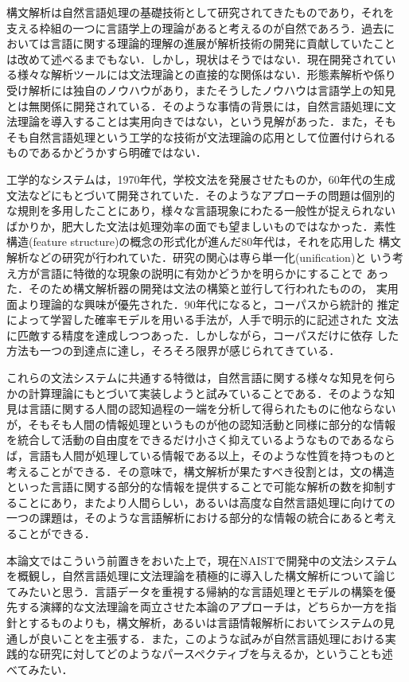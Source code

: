 構文解析は自然言語処理の基礎技術として研究されてきたものであり，それを
支える枠組の一つに言語学上の理論があると考えるのが自然であろう．過去に
おいては言語に関する理論的理解の進展が解析技術の開発に貢献していたこと
は改めて述べるまでもない．しかし，現状はそうではない．現在開発されてい
る様々な解析ツールには文法理論との直接的な関係はない．形態素解析や係り
受け解析には独自のノウハウがあり，またそうしたノウハウは言語学上の知見
とは無関係に開発されている．そのような事情の背景には，自然言語処理に文
法理論を導入することは実用向きではない，という見解があった．また，そも
そも自然言語処理という工学的な技術が文法理論の応用として位置付けられる
ものであるかどうかすら明確ではない．

工学的なシステムは，1970年代，学校文法を発展させたものか，60年代の生成
文法などにもとづいて開発されていた．そのようなアプローチの問題は個別的
な規則を多用したことにあり，様々な言語現象にわたる一般性が捉えられない
ばかりか，肥大した文法は処理効率の面でも望ましいものではなかった．素性
構造(feature structure)の概念の形式化が進んだ80年代は，それを応用した
構文解析などの研究が行われていた．研究の関心は専ら単一化(unification)と
いう考え方が言語に特徴的な現象の説明に有効かどうかを明らかにすることで
あった．そのため構文解析器の開発は文法の構築と並行して行われたものの，
実用面より理論的な興味が優先された．90年代になると，コーパスから統計的
推定によって学習した確率モデルを用いる手法が，人手で明示的に記述された
文法に匹敵する精度を達成しつつあった．しかしながら，コーパスだけに依存
した方法も一つの到達点に達し，そろそろ限界が感じられてきている．

これらの文法システムに共通する特徴は，自然言語に関する様々な知見を何ら
かの計算理論にもとづいて実装しようと試みていることである．そのような知
見は言語に関する人間の認知過程の一端を分析して得られたものに他ならない
が，そもそも人間の情報処理というものが他の認知活動と同様に部分的な情報
を統合して活動の自由度をできるだけ小さく抑えているようなものであるなら
ば，言語も人間が処理している情報である以上，そのような性質を持つものと
考えることができる．その意味で，構文解析が果たすべき役割とは，文の構造
といった言語に関する部分的な情報を提供することで可能な解析の数を抑制す
ることにあり，またより人間らしい，あるいは高度な自然言語処理に向けての
一つの課題は，そのような言語解析における部分的な情報の統合にあると考え
ることができる．

本論文ではこういう前置きをおいた上で，現在NAISTで開発中の文法システム
を概観し，自然言語処理に文法理論を積極的に導入した構文解析について論じ
てみたいと思う．言語データを重視する帰納的な言語処理とモデルの構築を優
先する演繹的な文法理論を両立させた本論のアプローチは，どちらか一方を指
針とするものよりも，構文解析，あるいは言語情報解析においてシステムの見
通しが良いことを主張する．また，このような試みが自然言語処理における実
践的な研究に対してどのようなパースペクティブを与えるか，ということも述
べてみたい．

